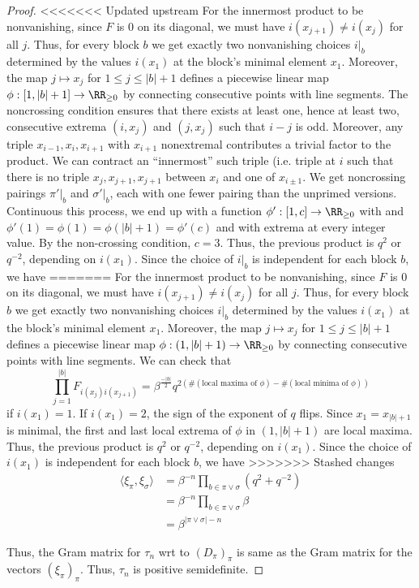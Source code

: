 \documentclass{article}
\begin{document}
\begin{proof}
<<<<<<< Updated upstream
      For the innermost product to be nonvanishing, since $F$ is $0$ on its diagonal, we must have $i(x_{j+1}) \neq i(x_{j})$ for all $j$.  Thus, for every block $b$ we get exactly two nonvanishing choices $i|_b$ determined by the values $i(x_1)$ at the block's minimal element $x_1$.  Moreover, the map $j \mapsto x_j$ for $1 \le j \le |b| + 1$ defines a piecewise linear map $\phi: [1, |b| +1] \to \RR_{\ge 0}$ by connecting consecutive points with line segments. The noncrossing condition ensures that there exists at least one, hence at least two, consecutive extrema $(i, x_j)$ and $(j, x_j)$ such that $i - j$ is odd.  Moreover, any triple $x_{i-1}, x_{i}, x_{i+1}$ with $x_{i+1}$ nonextremal contributes a trivial factor to the product.  We can contract an ``innermost'' such triple (i.e. triple at $i$ such that there is no triple $x_j, x_{j+1}, x_{j+1}$ between $x_i$ and one of $x_{i \pm 1}$.   We get noncrossing pairings $\pi'|_b$ and $\sigma'|_b$, each with one fewer pairing than the unprimed versions. Continuous this process, we end up with a function $\phi': [1, c] \to \RR_{\ge 0}$ with and $\phi'(1) = \phi(1) = \phi(|b|+1) = \phi'(c)$ and with extrema at every integer value.   By the non-crossing condition, $c = 3$.  Thus, the previous product is $q^2$ or $q^{-2}$, depending on $i(x_1)$.  Since the choice of $i|_b$ is independent for each block $b$, we have
=======
      For the innermost product to be nonvanishing, since $F$ is $0$ on its diagonal, we must have $i(x_{j+1}) \neq i(x_{j})$ for all $j$.  Thus, for every block $b$ we get exactly two nonvanishing choices $i|_b$ determined by the values $i(x_1)$ at the block's minimal element $x_1$.  Moreover, the map $j \mapsto x_j$ for $1 \le j \le |b| + 1$ defines a piecewise linear map $\phi: (1, |b| +1) \to \RR_{\ge 0}$ by connecting consecutive points with line segments. We can check that
      $$ \prod_{j = 1}^{|b|} F_{i(x_j)i(x_{j+1})}   = \beta^{\frac{-|b|}{2}} q^{2(\# (\text{local maxima of } \phi)- \# (\text{local minima of } \phi))} $$
      if $i(x_1) = 1$.  If $i(x_1) = 2$, the sign of the exponent of $q$ flips.   Since $x_1 = x_{|b| + 1}$ is minimal, the first and last local extrema of $\phi$ in $(1, |b| + 1)$ are local maxima.  Thus, the previous product is $q^2$ or $q^{-2}$, depending on $i(x_1)$.  Since the choice of $i(x_1)$ is independent for each block $b$, we have
>>>>>>> Stashed changes
\begin{align*}
  \langle \xi_\pi, \xi_\sigma \rangle &  = \beta^{-n} \prod_{b \in \pi \vee \sigma} (q^2 + q^{-2})   \\
  & = \beta^{-n} \prod_{b \in \pi \vee \sigma} \beta \\
  & = \beta^{|\pi \vee \sigma| - n} 
\end{align*}

Thus, the Gram matrix for $\tau_n$ wrt to $(D_\pi)_\pi$ is same as the Gram matrix for the vectors $(\xi_\pi)_\pi$. Thus, $\tau_n$ is positive semidefinite.
\end{proof}
  
\end{document}
